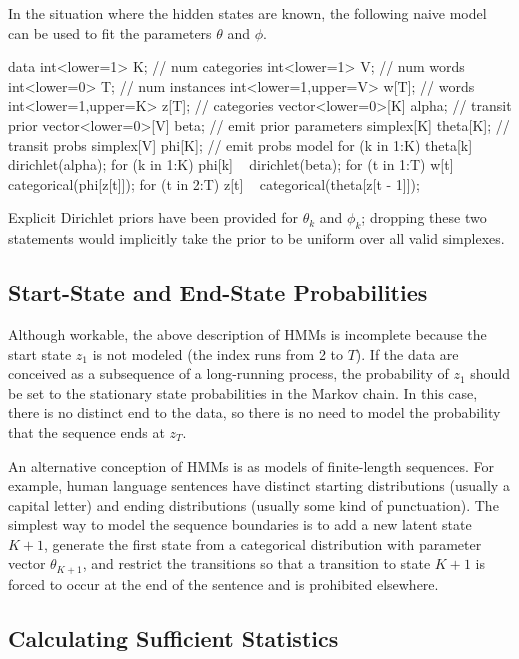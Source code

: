 In the situation where the hidden states are known, the following
naive model can be used to fit the parameters $\theta$ and $\phi$.
%
\begin{stancode}
data {
  int<lower=1> K;  // num categories
  int<lower=1> V;  // num words
  int<lower=0> T;  // num instances
  int<lower=1,upper=V> w[T]; // words
  int<lower=1,upper=K> z[T]; // categories
  vector<lower=0>[K] alpha;  // transit prior
  vector<lower=0>[V] beta;   // emit prior
}
parameters {
  simplex[K] theta[K];  // transit probs
  simplex[V] phi[K];    // emit probs
}
model {
  for (k in 1:K) 
    theta[k] ~ dirichlet(alpha);
  for (k in 1:K)
    phi[k] ~ dirichlet(beta);
  for (t in 1:T)
    w[t] ~ categorical(phi[z[t]]);
  for (t in 2:T)
    z[t] ~ categorical(theta[z[t - 1]]);
}
\end{stancode}
%
Explicit Dirichlet priors have been provided for $\theta_k$ and
$\phi_k$; dropping these two statements would implicitly take the
prior to be uniform over all valid simplexes.

\subsection{Start-State and End-State Probabilities}

Although workable, the above description of HMMs is incomplete because
the start state $z_1$ is not modeled (the index runs from 2 to $T$).
If the data are conceived as a subsequence of a long-running process,
the probability of $z_1$ should be set to the stationary state
probabilities in the Markov chain.  In this case, there is no distinct
end to the data, so there is no need to model the probability that the
sequence ends at $z_T$.  

An alternative conception of HMMs is as models of finite-length
sequences.  For example, human language sentences have distinct
starting distributions (usually a capital letter) and ending
distributions (usually some kind of punctuation).  The simplest way to
model the sequence boundaries is to add a new latent state $K+1$,
generate the first state from a categorical distribution with
parameter vector $\theta_{K+1}$, and restrict the transitions so that
a transition to state $K+1$ is forced to occur at the end of the
sentence and is prohibited elsewhere.

\subsection{Calculating Sufficient Statistics}

